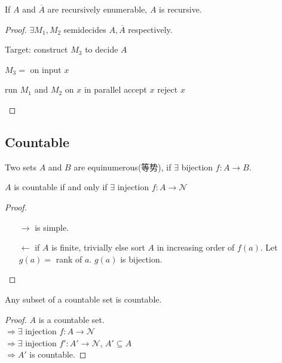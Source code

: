 \begin{theorem}\label{the:aaa}
    If $A$ and $\overline{A}$ are recursively enumerable, $A$ is recursive. 
\end{theorem}
\begin{proof}
    $\exists M_1, M_2$ semidecides $A, \overline{A}$ respectively.

    Target: construct $M_3$ to decide $A$

    $M_3=$ on input $x$
    \begin{algorithm}[H]
        \caption{$M_3$}
        \begin{algorithmic}
            \State run $M_1$ and $M_2$ on $x$ in parallel
                \State accept $x$
                \State reject $x$
            \EndIf
        \end{algorithmic}
    \end{algorithm}
\end{proof}

\subsection{Countable}

\begin{definition}
    Two sets $A$ and $B$ are equinumerous(等势), if $\exists$ bijection $f:A\to B$. 
\end{definition}

\begin{lemma}
    $A$ is countable if and only if $\exists$ injection $f:A\to \mathcal{N}$
\end{lemma}
\begin{proof}\quad

    \begin{enumerate}
        \item [$\to$] is simple. 
        \item [$\leftarrow$] if $A$ is finite, trivially
        \subitem else sort $A$ in increasing order of $f(a)$. Let $g(a)=$ rank of $a$. $g(a)$ is bijection. 
    \end{enumerate}
\end{proof}

\begin{corollary}
    Any subset of a countable set is countable. 
\end{corollary}
\begin{proof}
    $A$ is a countable set. \\
    $\Rightarrow \exists$ injection $f:A\to \mathcal{N}$\\
    $\Rightarrow \exists$ injection $f':A' \to \mathcal{N}$, $A'\subseteq A$\\
    $\Rightarrow A'$ is countable. 
\end{proof}

